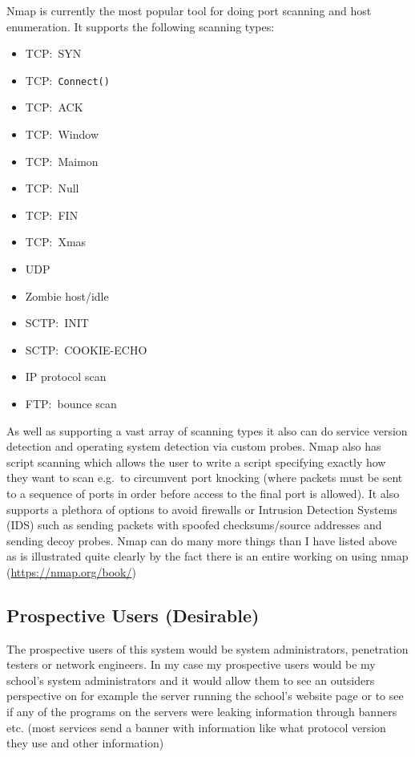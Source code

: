 \documentclass[titlepage]{article}
\begin{document}
Nmap is currently the most popular tool for doing port scanning and host enumeration.
It supports the following scanning types:

\begin{itemize}
\item{TCP:\ SYN}
\item{TCP:\ \verb|Connect()|}
\item{TCP:\ ACK}
\item{TCP:\ Window}
\item{TCP:\ Maimon}
\item{TCP:\ Null}
\item{TCP:\ FIN}
\item{TCP:\ Xmas}
\item{UDP}
\item{Zombie host/idle}
\item{SCTP:\ INIT}
\item{SCTP:\ COOKIE-ECHO}
\item{IP protocol scan}
\item{FTP:\ bounce scan}
\end{itemize}

As well as supporting a vast array of scanning types it also can do service version detection
and operating system detection via custom probes. Nmap also has script scanning which allows
the user to write a script specifying exactly how they want to scan e.g.\ to circumvent port
knocking (where packets must be sent to a sequence of ports in order before access to the final port is allowed).
It also supports a plethora of options to avoid firewalls or Intrusion Detection Systems (IDS) such as sending
packets with spoofed checksums/source addresses and sending decoy probes. Nmap can do many more things than I
have listed above as is illustrated quite clearly by the fact there is an entire working on using nmap
(\href{https://nmap.org/book/}{https://nmap.org/book/})

\subsection{Prospective Users (Desirable)}

The prospective users of this system would be system administrators, penetration testers or network engineers.
In my case my prospective users would be my school's system administrators and it would allow them to see an
outsiders perspective on for example the server running the school's website page or to see if any of the
programs on the servers were leaking information through banners etc. (most services send a banner with
information like what protocol version they use and other information)
\end{document}
